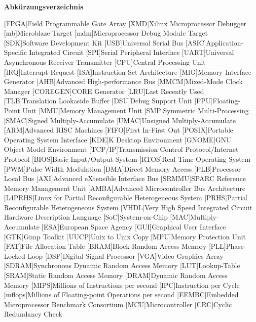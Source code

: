 
{\textbf{Abkürzungsverzeichnis}}

\begin{acronym}[Bash]
 [FPGA]{Field Programmable Gate Array}
 [XMD]{Xilinx Microprocessor Debugger}
 [mb]{Microblaze Target}
 [mdm]{Microprocessor Debug Module Target}
 [SDK]{Software Development Kit}
 [USB]{Universal Serial Bus}
 [ASIC]{Application-Specific Integrated Circuit}
 [SPI]{Serial Peripheral Interface}
 [UART]{Universal Asynchronous Receiver Transmitter}
 [CPU]{Central Processing Unit}
 [IRQ]{Interrupt-Request}
 [ISA]{Instruction Set Architecture}
 [MIG]{Memory Interface Generator}
 [AHB]{Advanced High-performance Bus}
 [MMCM]{Mixed-Mode Clock Manager}
 [COREGEN]{CORE Generator}
  [LRU]{Last Recently Used}
  [TLB]{Translation Lookaside Buffer}
  [DSU]{Debug Support Unit}
  [FPU]{Floating-Point Unit}
 [MMU]{Memory Management Unit}
  [SMP]{Symmetric Multi-Processing}
 [SMAC]{Signed Multiply-Accumulate}
  [UMAC]{Unsigned Multiply-Accumulate}
 [ARM]{Advanced RISC Machines}
 [FIFO]{First In-First Out}
 [POSIX]{Portable Operating System Interface}
 [KDE]{K Desktop Environment}
 [GNOME]{GNU Object Model Environment}
  [TCP/IP]{Transmission Control Protocol/Internet Protocol}
[BIOS]{Basic Input/Output System}
 [RTOS]{Real-Time Operating System}
 [PWM]{Pulse Width Modulation}
  [DMA]{Direct Memory Access}
 [PLB]{Processor Local Bus}
 [AXI]{Advanced eXtensible Interface Bus}
[SRMMU]{SPARC Reference Memory Management Unit}
 [AMBA]{Advanced Microcontroller Bus Architecture}
  [L4PRHS]{Linux for Partial Reconfigurable Heterogeneous System}
   [PRHS]{Partial Reconfigurable Heterogeneous System}
[VHDL]{Very High Speed Integrated Circuit Hardware Description Language}
[SoC]{System-on-Chip}
[MAC]{Multiply-Accumulate}
 [ESA]{European Space Agency}
 [GUI]{Graphical User Interface}
 [GTK]{Gimp Toolkit}
 [UUCP]{Unix to Unix Copy}
 [MPU]{Memory Protection Unit}
[FAT]{File Allocation Table}
  [BRAM]{Block Random Access Memory}
  [PLL]{Phase-Locked Loop}
  [DSP]{Digital Signal Processor}
  [VGA]{Video Graphics Array}
[SDRAM]{Synchronous Dynamic Random Access Memory}
 [LUT]{Lookup-Table}
 [SRAM]{Static Random Access Memory}
[DRAM]{Dynamic Random Access Memory}
 [MIPS]{Millions of Instructions per second}
 [IPC]{Instruction per Cycle}
[mflops]{Millions of Floating-point Operations per second}
[EEMBC]{Embedded Microprocessor Benchmark Consortium}
[MCU]{Microcontroller}
[CRC]{Cyclic Redundancy Check}

\end{acronym}
